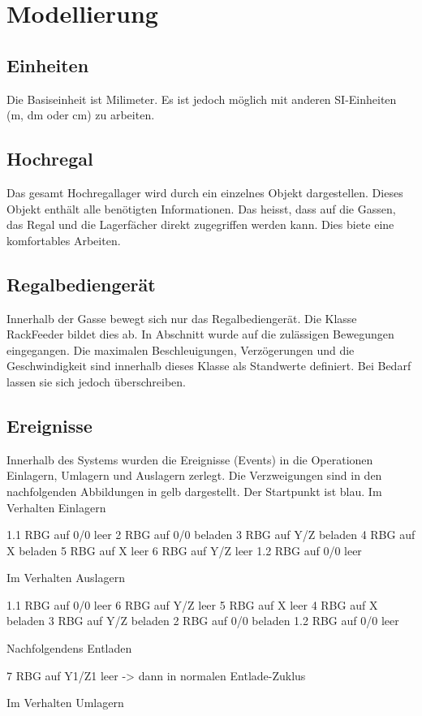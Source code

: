 \section{Modellierung}


\subsection{Einheiten}
Die Basiseinheit ist Milimeter. Es ist jedoch möglich mit anderen SI-Einheiten (m, dm oder cm) zu arbeiten.
%
\subsection{Hochregal}
Das gesamt Hochregallager wird durch ein einzelnes Objekt dargestellen. Dieses Objekt enthält alle benötigten Informationen. Das heisst, dass auf die Gassen, das Regal und die Lagerfächer direkt zugegriffen werden kann. Dies biete eine komfortables Arbeiten. 

%
\subsection{Regalbediengerät}
Innerhalb der Gasse bewegt sich nur das Regalbediengerät. Die Klasse RackFeeder bildet dies ab. In Abschnitt wurde auf die zulässigen Bewegungen eingegangen. Die maximalen Beschleuigungen, Verzögerungen und die Geschwindigkeit sind innerhalb dieses Klasse als Standwerte definiert. Bei Bedarf lassen sie sich jedoch überschreiben.
%
\subsection{Ereignisse}
Innerhalb des Systems wurden die Ereignisse (Events) in die Operationen Einlagern, Umlagern und Auslagern zerlegt. Die Verzweigungen sind in den nachfolgenden Abbildungen in gelb dargestellt. Der Startpunkt ist blau. 
%
Im Verhalten Einlagern

1.1 RBG auf 0/0 leer
2 RBG auf 0/0 beladen
3 RBG auf Y/Z beladen
4 RBG auf X beladen
5 RBG auf X leer
6 RBG auf Y/Z leer
1.2 RBG auf 0/0 leer

Im Verhalten Auslagern

1.1 RBG auf 0/0 leer
6 RBG auf Y/Z leer
5 RBG auf X leer
4 RBG auf X beladen
3 RBG auf Y/Z beladen
2 RBG auf 0/0 beladen
1.2 RBG auf 0/0 leer

Nachfolgendens Entladen

7 RBG auf Y1/Z1 leer -> dann in normalen Entlade-Zuklus

Im Verhalten Umlagern

